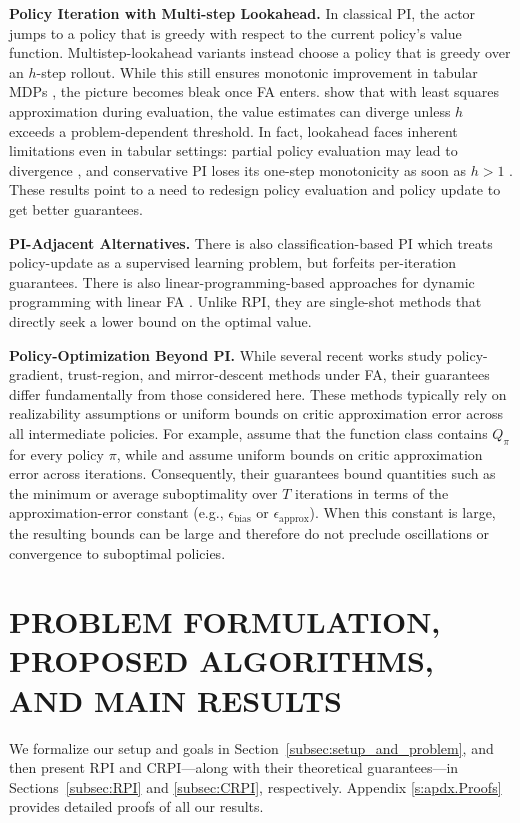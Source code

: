 \documentclass[twoside]{article}
\theoremstyle{plain}
\theoremstyle{definition}
\theoremstyle{remark}
\newcommand{\CRPI}{CRPI}
\begin{document}
\textbf{Policy Iteration with Multi-step Lookahead.} In classical PI, the actor jumps to a policy that is 
greedy with respect to the current policy's value function. Multistep-lookahead variants instead choose a policy that is greedy over an 
$h$-step rollout. While this still ensures monotonic improvement in tabular MDPs \citep{efroni2018beyond}, the picture becomes bleak once FA enters. 
\cite{winnicki2021role} show that 
with least squares approximation during evaluation, the value estimates can diverge unless $h$ exceeds a problem-dependent threshold. In fact, lookahead faces inherent limitations even in tabular settings: partial policy evaluation 
may lead to divergence \citep{efroni2019combine}, and conservative PI loses its one-step monotonicity as soon as $h > 1$ \citep{efroni2018multiple}. 
These results point to a need to redesign policy evaluation and policy update to get better guarantees. 

\textbf{PI-Adjacent Alternatives.} There is also classification-based PI \citep{lazaric2010analysis} which treats policy-update as a supervised learning problem, but forfeits per-iteration guarantees. There is also linear-programming-based approaches for dynamic programming with linear FA \citep{de2003linear}. Unlike RPI, they are single-shot methods that directly seek a lower bound on the optimal value. 

\textbf{Policy-Optimization Beyond PI.} While several recent works study policy-gradient, trust-region, and mirror-descent methods under FA, their guarantees differ fundamentally from those considered here. These methods typically rely on realizability assumptions or uniform bounds on critic approximation error across all intermediate policies. For example, \citet{liu2019neural} assume that the function class contains $Q_\pi$ for every policy $\pi$, while \citet{agarwal2021theory} and \citet{alfano2023novel} assume uniform bounds on critic approximation error across iterations. Consequently, their guarantees bound quantities such as the minimum or average suboptimality over $T$ iterations in terms of the approximation-error constant (e.g., $\epsilon_{\text{bias}}$ or $\epsilon_{\text{approx}}$). When this constant is large, the resulting bounds can be large and therefore do not preclude oscillations or convergence to suboptimal policies.


\section{PROBLEM FORMULATION, PROPOSED ALGORITHMS, AND MAIN RESULTS}
\label{s:setup.algoroithm.results}
%
We formalize our setup and goals in Section~\ref{subsec:setup_and_problem}, and then present RPI and \CRPI---along with their theoretical guarantees---in Sections~\ref{subsec:RPI} and \ref{subsec:CRPI}, respectively. Appendix \ref{s:apdx.Proofs} provides detailed proofs of all our results.
\end{document}
